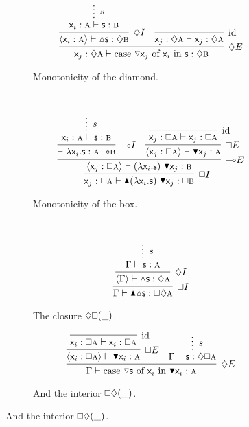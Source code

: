 \begin{figure}
	\centering
	\begin{subfigure}{1\textwidth}
		\[
			\infer[\diamond E]{\term{\varj}: \diamond \prop{a} \vdash  \cterm{case \term{\diaelim \varj} of \term{\vari } in \term{s}}: \diamond \prop{b}}{
					\infer[\diamond I]{\bracket{\term{\vari }: \prop{a}} \vdash \diaintro \term{s}: \diamond \prop{b}}{
						\infer*[s]{\term{\vari }: \prop{a} \vdash \term{s}: \prop{b}}{}
					}
					&
					\infer[\Ax]{\term{\varj}: \diamond \prop{a} \vdash \term{\varj}: \diamond \prop{a}}{}
			}
		\]
		\caption{Monotonicity of the diamond.}
		\label{subfigure:modal_properties:diamond_mono}
	\end{subfigure}\\[\smallsep]
	\begin{subfigure}{1\textwidth}
		\[
			\infer[\bx I]{\term{\varj}: \bx \prop{a} \vdash \boxintro{(\term{\lam \vari .s})~\term{\boxelim \varj}}:\bx \prop{b}}{
				\infer[\li E]{\bracket{\term{\varj}: \bx \prop{a}} \vdash (\term{\lam \vari .s})~\term{\boxelim \varj}: \prop{b}}{
					\infer[\li I]{\vdash \term{\lam \vari .s}: \prop{a} \li\prop{b}}{
						\infer*[s]{\term{\vari }: \prop{a} \vdash \term{s}: \prop{b}}{}
					}
					&
					\infer[\bx E]{\bracket{\term{\varj}: \bx \prop{a}} \vdash \boxelim\term{\varj}:\prop{a}}{	
						\infer[\Ax]{\term{\varj}: \bx\prop{a} \vdash \term{\varj}: \bx\prop{a}}{}
					}
				}
			}
		\]
		\caption{Monotonicity of the box.}
		\label{subfigure:modal_properties:box_mono}
	\end{subfigure}\\[\smallsep]
	\begin{subfigure}{0.4\textwidth}
		\[
		\infer[\bx I]{\Gamma \vdash \boxintro\diaintro\term{s}:\bx \diamond \prop{a}}{
			\infer[\diamond I]{\bracket{\Gamma} \vdash \diaintro\term{s}: \diamond \prop{a}}{
				\infer*[s]{\Gamma \vdash \term{s}: \prop{a}}{}
			}
		}
		\]
		\caption{The closure $\diamond\bx(\_)$.}
		\label{subfigure:modal_properties:closure}
	\end{subfigure}%
	\begin{subfigure}{0.5\textwidth}
		\[
		\infer[\diamond E]{\Gamma \vdash \cterm{case \term{\diaelim{s}} of \term{\vari } in \term{\boxelim \vari }}: \prop{a}}{
						\infer[\bx E]{\bracket{\term{\vari }: \bx \prop{a}}\vdash \boxelim\term{\vari }:\prop{a}}{
							\infer[\Ax]{\term{\vari }: \bx\prop{a} \vdash \term{\vari }: \bx\prop{a}}{}
						}
						&
						\infer*[s]{\Gamma\vdash \term{s}: \diamond \bx \prop{a}}{}
				}
		\]
		\caption{And the interior $\bx\diamond(\_)$.}

\end{subfigure}
\end{figure}
